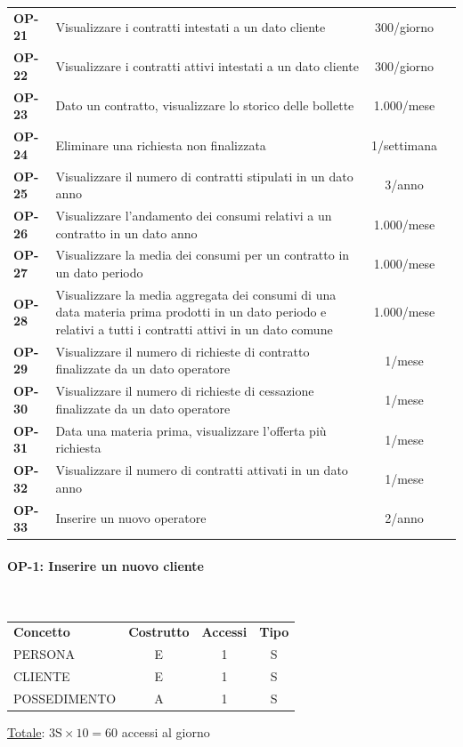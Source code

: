 \documentclass[a4paper,12pt]{report}
\begin{document}
\begin{longtable}{l p{10cm} c r}
    \textbf{OP-21} & Visualizzare i contratti intestati a un dato cliente & 300/giorno \\
    \textbf{OP-22} & Visualizzare i contratti attivi intestati a un dato cliente & 300/giorno \\
    \textbf{OP-23} & Dato un contratto, visualizzare lo storico delle bollette & 1.000/mese \\
    \textbf{OP-24} & Eliminare una richiesta non finalizzata & 1/settimana \\
    \textbf{OP-25} & Visualizzare il numero di contratti stipulati in un dato anno & 3/anno \\
    \textbf{OP-26} & Visualizzare l'andamento dei consumi relativi a un contratto in un dato anno & 1.000/mese \\
    \textbf{OP-27} & Visualizzare la media dei consumi per un contratto in un dato periodo & 1.000/mese \\
    \textbf{OP-28} & Visualizzare la media aggregata dei consumi di una data materia prima prodotti in un dato periodo e relativi a tutti i contratti attivi in un dato comune & 1.000/mese \\
    \textbf{OP-29} & Visualizzare il numero di richieste di contratto finalizzate da un dato operatore & 1/mese \\
    \textbf{OP-30} & Visualizzare il numero di richieste di cessazione finalizzate da un dato operatore & 1/mese \\
    \textbf{OP-31} & Data una materia prima, visualizzare l'offerta più richiesta & 1/mese \\
    \textbf{OP-32} & Visualizzare il numero di contratti attivati in un dato anno & 1/mese \\
    \textbf{OP-33} & Inserire un nuovo operatore & 2/anno \\
    \hline
\end{longtable}

\paragraph{OP-1: Inserire un nuovo cliente}\mbox{}\\
\begin{center}
\begin{tabular}{@{}l c  c  c@{}}
    \hline
    \textbf{Concetto} & \textbf{Costrutto} & \textbf{Accessi} & \textbf{Tipo} \\ [0.5ex]
    PERSONA & E & 1 & S \\
    CLIENTE & E & 1 & S \\
    POSSEDIMENTO & A & 1 & S \\
    \hline
\end{tabular}
\end{center}
\underline{Totale}: $3 \text{S} \times 10 = 60$ accessi al giorno 
\end{document}
